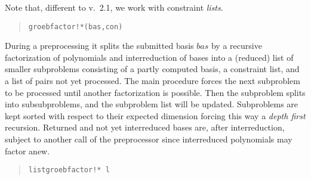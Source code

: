 Note that, different to v.\ 2.1, we work with constraint {\em lists}.
\begin{quote}
\verb|groebfactor!*(bas,con)|

\end{quote}
During a preprocessing it splits the submitted basis $bas$ by a
recursive factorization of polynomials and interreduction of bases
into a (reduced) list of smaller subproblems consisting of a partly
computed \gr basis, a constraint list, and a list of pairs not yet
processed. The main procedure forces the next subproblem to be
processed until another factorization is possible. Then the
subproblem splits into subsubproblems, and the subproblem list will
be updated. Subproblems are kept sorted with respect to their
expected dimension  forcing this way a {\em depth first}
recursion.  Returned and not yet interreduced \gr bases are, after
interreduction, subject to another call of the preprocessor since
interreduced polynomials may factor anew.
\begin{quote}
\verb|listgroebfactor!* l|

\end{quote}
\medskip

